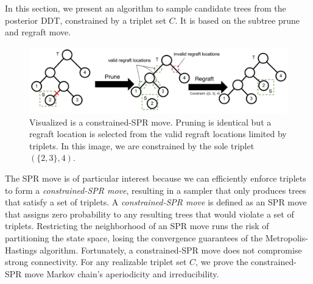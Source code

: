 In this section, we present an algorithm
to sample candidate trees 
from the posterior DDT, constrained
by a triplet set $C$.
It is based on the subtree prune and regraft move.

\begin{figure}[htp!]
    \centering
    \includegraphics[width=\textwidth]{img/ibhc/ConstrainedSPRMove}
    \caption{
            Visualized is a constrained-SPR move.
            Pruning is identical  but
            a regraft location is selected from the valid regraft locations
            limited by triplets.
            In this image, we are constrained by the sole triplet $(\{2, 3\}, 4)$.
            }
    \label{fig:constrainedsprmove}
\end{figure}

The SPR move is of particular interest
because we can efficiently
enforce triplets to form a \emph{constrained-SPR move},
resulting in a sampler
that only produces trees that satisfy a set of triplets.
A \emph{constrained-SPR move} is defined as
an SPR move that assigns zero probability to
any resulting trees that would violate a set of triplets.
Restricting the neighborhood of an SPR move
runs the risk of partitioning the state space,
losing the convergence
guarantees of the Metropolis-Hastings algorithm.
Fortunately, a constrained-SPR move does not compromise
strong connectivity.
For any realizable triplet set $C$,
we prove 
the constrained-SPR move Markov chain's aperiodicity and irreducibility.

